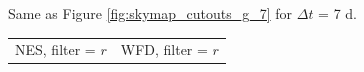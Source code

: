 \documentclass[preprintm,linenumbers]{aastex631}
\begin{document}
\begin{figure}
\begin{tabular}{@{}c@{}c@{}}
			\end{tabular}
			\caption{
   Same as Figure \ref{fig:skymap_cutouts_g_7} for $\Delta t$ = 7 d. 
    }
	\label{fig:_skymap_cutouts_g_7}
		\end{figure}

  
  	\begin{figure}
			\centering
            			\begin{tabular}{@{}c@{}c@{}}
                 NES, filter = $r$ & WFD, filter = $r$ \\

\end{tabular}
\end{figure}
\end{document}
